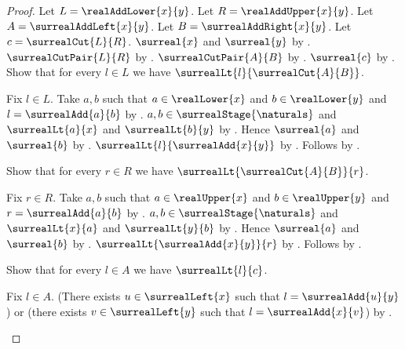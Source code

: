 \begin{proof}
    Let $L=\realAddLower{x}{y}$.
    Let $R=\realAddUpper{x}{y}$.
    Let $A=\surrealAddLeft{x}{y}$.
    Let $B=\surrealAddRight{x}{y}$.
    Let $c=\surrealCut{L}{R}$.
    $\surreal{x}$ and $\surreal{y}$
        by .
    $\surrealCutPair{L}{R}$
        by .
    $\surrealCutPair{A}{B}$
        by .
    $\surreal{c}$
        by .
    Show that for every $l\in L$ we have
        $\surrealLt{l}{\surrealCut{A}{B}}$.
    \begin{subproof}
        Fix $l\in L$.
        Take $a,b$ such that
            $a\in\realLower{x}$ and $b\in\realLower{y}$ and
            $l=\surrealAdd{a}{b}$
            by .
        $a,b\in\surrealStage{\naturals}$ and
            $\surrealLt{a}{x}$ and $\surrealLt{b}{y}$
            by .
        Hence $\surreal{a}$ and $\surreal{b}$
            by
            .
        $\surrealLt{l}{\surrealAdd{x}{y}}$
            by .
        Follows by .
    \end{subproof}
    Show that for every $r\in R$ we have
        $\surrealLt{\surrealCut{A}{B}}{r}$.
    \begin{subproof}
        Fix $r\in R$.
        Take $a,b$ such that
            $a\in\realUpper{x}$ and $b\in\realUpper{y}$ and
            $r=\surrealAdd{a}{b}$
            by .
        $a,b\in\surrealStage{\naturals}$ and
            $\surrealLt{x}{a}$ and $\surrealLt{y}{b}$
            by .
        Hence $\surreal{a}$ and $\surreal{b}$
            by
            .
        $\surrealLt{\surrealAdd{x}{y}}{r}$
            by .
        Follows by .
    \end{subproof}
    Show that for every $l\in A$ we have $\surrealLt{l}{c}$.
    \begin{subproof}
        Fix $l\in A$.
        (There exists $u\in\surrealLeft{x}$ such that
            $l=\surrealAdd{u}{y}$) or
        (there exists $v\in\surrealLeft{y}$ such that
            $l=\surrealAdd{x}{v}$)
            by .
        \begin{byCase}
\end{byCase}
\end{subproof}
\end{proof}

